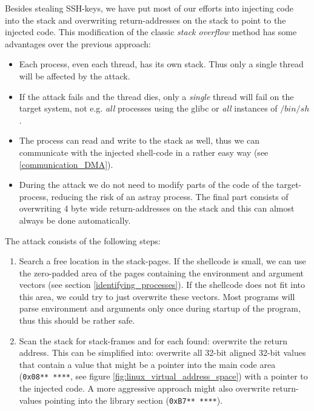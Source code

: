 \label{overwriting_stack} Besides stealing SSH-keys, we have put most of our
efforts into injecting code into the stack and overwriting return-addresses on
the stack to point to the injected code. This modification of the classic
\emph{stack overflow} method has some advantages over the previous approach:

\begin{itemize}

	\item Each process, even each thread, has its own stack. Thus only a
		single thread will be affected by the attack.

	\item If the attack fails and the thread dies, only a \emph{single}
		thread will fail on the target system, not e.g. \emph{all}
		processes using the glibc or \emph{all} instances of $/bin/sh$.

	\item The process can read and write to the stack as well, thus we can
		communicate with the injected shell-code in a rather easy way
		(see \ref{communication_DMA}).

	\item During the attack we do not need to modify parts of the code of
		the target-process, reducing the risk of an astray process. The
		final part consists of overwriting 4 byte wide return-addresses
		on the stack and this can almost always be done automatically.

\end{itemize}

The attack consists of the following steps:

\begin{enumerate}

	\item Search a free location in the stack-pages. If the shellcode is
		small, we can use the zero-padded area of the pages containing
		the environment and argument vectors (see section
		\ref{identifying_processes}). If the shellcode does not fit into
		this area, we could try to just overwrite these vectors. Most
		programs will parse environment and arguments only once during
		startup of the program, thus this should be rather safe.

	\item Scan the stack for stack-frames and for each found: overwrite the
		return address. This can be simplified into: overwrite all
		32-bit aligned 32-bit values that contain a value that might be
		a pointer into the main code area (\texttt{0x08**~****}, see
		figure \ref{fig:linux_virtual_address_space}) with a pointer to
		the injected code.  A more aggressive approach might also
		overwrite return-values pointing into the library section
		(\texttt{0xB7**~****}).

\end{enumerate}

